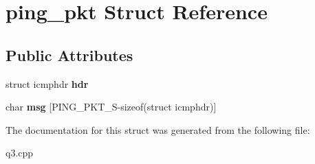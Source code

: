 \hypertarget{structping__pkt}{}\section{ping\+\_\+pkt Struct Reference}
\label{structping__pkt}
\subsection*{Public Attributes}
\begin{DoxyCompactItemize}
\item 
\mbox{\label{structping__pkt_aa7bae735804eb767ae1fc661e5c7c365}} 
struct icmphdr {\bfseries hdr}
\item 
\mbox{\label{structping__pkt_a37344dcd7999496fe651d944a76af026}} 
char {\bfseries msg} \mbox{[}P\+I\+N\+G\+\_\+\+P\+K\+T\+\_\+S-\/sizeof(struct icmphdr)\mbox{]}
\end{DoxyCompactItemize}


The documentation for this struct was generated from the following file\+:\begin{DoxyCompactItemize}
\item 
q3.\+cpp\end{DoxyCompactItemize}
